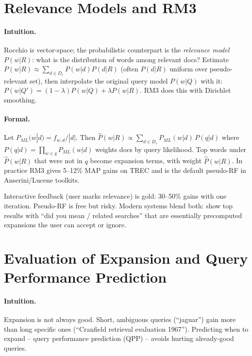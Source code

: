
\section{Relevance Models and RM3}\label{sec:rm3}
\paragraph{Intuition.} Rocchio is vector-space; the probabilistic counterpart is the \emph{relevance model} $P(w|R)$: what is the distribution of words among relevant docs? Estimate $P(w|R)\approx \sum_{d\in D_r} P(w|d)P(d|R)$ (often $P(d|R)$ uniform over pseudo-relevant set), then interpolate the original query model $P(w|Q)$ with it: $P(w|Q')=(1-\lambda)P(w|Q)+\lambda P(w|R)$. RM3 does this with Dirichlet smoothing.

\paragraph{Formal.} Let $P_{ML}(w|d)=f_{w,d}/|d|$. Then $\hat{P}(w|R)\propto \sum_{d\in D_r} P_{ML}(w|d)\,P(q|d)$ where $P(q|d)=\prod_{w\in q}P_{ML}(w|d)$ weights docs by query likelihood. Top words under $\hat{P}(w|R)$ that were not in $q$ become expansion terms, with weight $\hat{P}(w|R)$. In practice RM3 gives 5--12\% MAP gains on TREC and is the default pseudo-RF in Anserini/Lucene toolkits.

\begin{remark}
Interactive feedback (user marks relevance) is gold: 30--50\% gains with one iteration. Pseudo-RF is free but risky. Modern systems blend both: show top results with ``did you mean / related searches'' that are essentially precomputed expansions the user can accept or ignore.
\end{remark}


\section{Evaluation of Expansion and Query Performance Prediction}\label{sec:qpp}
\paragraph{Intuition.} Expansion is not always good. Short, ambiguous queries (``jaguar'') gain more than long specific ones (``Cranfield retrieval evaluation 1967''). Predicting when to expand -- query performance prediction (QPP) -- avoids hurting already-good queries.

